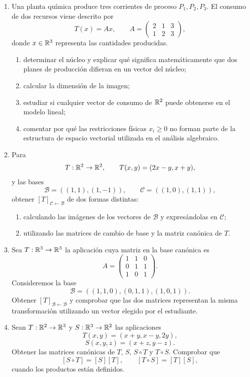\begin{enumerate}[label=\textbf{\arabic*.},leftmargin=*]
\item Una planta química produce tres corrientes de proceso $P_1,P_2,P_3$. El consumo de dos recursos viene descrito por
\[
T(x)=Ax,
\qquad
A=
\begin{pmatrix}
2&1&3\\
1&2&3
\end{pmatrix},
\]
donde $x\in\mathbb{R}^3$ representa las cantidades producidas.
\begin{enumerate}[label=\alph*)]
\item determinar el núcleo y explicar qué significa matemáticamente que dos planes de producción difieran en un vector del núcleo;
\item calcular la dimensión de la imagen;
\item estudiar si cualquier vector de consumo de $\mathbb{R}^2$ puede obtenerse en el modelo lineal;
\item comentar por qué las restricciones físicas $x_i\geq0$ no forman parte de la estructura de espacio vectorial utilizada en el análisis algebraico.
\end{enumerate}

\item Para
\[
T:\mathbb{R}^2\to\mathbb{R}^2,
\qquad
T(x,y)=(2x-y,x+y),
\]
y las bases
\[
\mathcal B=((1,1),(1,-1)),
\qquad
\mathcal C=((1,0),(1,1)),
\]
obtener $[T]_{\mathcal C\leftarrow\mathcal B}$ de dos formas distintas:
\begin{enumerate}[label=\alph*)]
\item calculando las imágenes de los vectores de $\mathcal B$ y expresándolas en $\mathcal C$;
\item utilizando las matrices de cambio de base y la matriz canónica de $T$.
\end{enumerate}

\item Sea $T:\mathbb{R}^3\to\mathbb{R}^3$ la aplicación cuya matriz en la base canónica es
\[
A=
\begin{pmatrix}
1&1&0\\
0&1&1\\
1&0&1
\end{pmatrix}.
\]
Consideremos la base
\[
\mathcal B=((1,1,0),(0,1,1),(1,0,1)).
\]
Obtener $[T]_{\mathcal B\leftarrow\mathcal B}$ y comprobar que las dos matrices representan la misma transformación utilizando un vector elegido por el estudiante.

\item Sean $T:\mathbb{R}^2\to\mathbb{R}^3$ y $S:\mathbb{R}^3\to\mathbb{R}^2$ las aplicaciones
\[
T(x,y)=(x+y,x-y,2y),
\]
\[
S(x,y,z)=(x+z,y-z).
\]
Obtener las matrices canónicas de $T$, $S$, $S\circ T$ y $T\circ S$. Comprobar que
\[
[S\circ T]=[S][T],
\qquad
[T\circ S]=[T][S],
\]
cuando los productos están definidos.


\end{enumerate}

